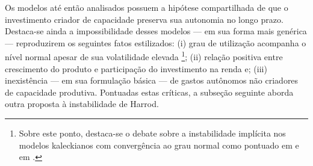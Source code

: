  
Os modelos até então analisados possuem a hipótese compartilhada de que o investimento criador de capacidade preserva sua autonomia no longo prazo.  
Destaca-se ainda a impossibilidade desses modelos --- em sua forma mais genérica --- reproduzirem os seguintes fatos estilizados: 
(i) grau de utilização acompanha o nível normal apesar de sua volatilidade elevada \cites[p.~110--111]{serrano_long_1995}{gahn_empirical_2019}\footnote{Sobre este ponto, destaca-se o debate sobre a instabilidade implícita nos modelos kaleckianos com convergência ao grau normal como pontuado em \textcite{hein_instability_2011} e em \textcite{allain_tackling_2015}.}; 
(ii) relação positiva entre crescimento do produto e participação do investimento na renda \cites{braga_investment_2018}{haluska_growth_2019} e;
(iii) inexistência --- em sua formulação básica --- de gastos autônomos não criadores de capacidade produtiva.
Pontuadas estas críticas, a subseção seguinte aborda outra proposta à instabilidade de Harrod.


